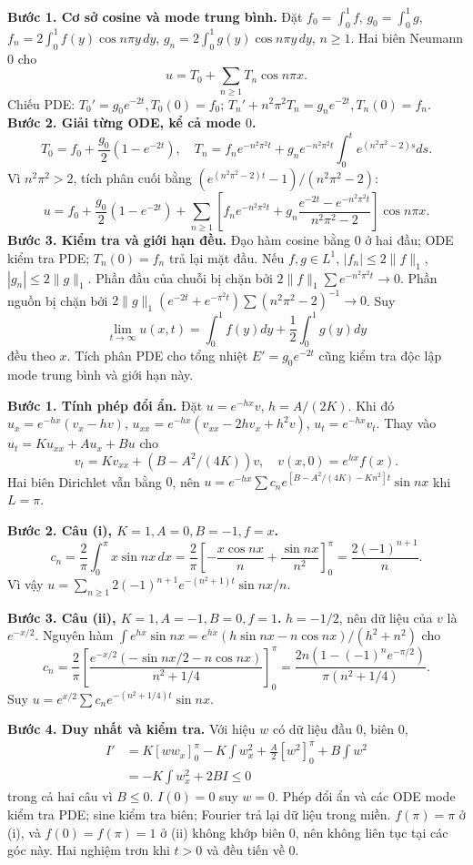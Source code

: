 \textbf{Bước 1. Cơ sở cosine và mode trung bình.}
Đặt $f_0=\int_0^1f$, $g_0=\int_0^1g$, $f_n=2\int_0^1f(y)\cos n\pi y\,dy$, $g_n=2\int_0^1g(y)\cos n\pi y\,dy$, $n\ge1$. Hai biên Neumann $0$ cho
\[u=T_0+\sum_{n\ge1}T_n\cos n\pi x.\]
Chiếu PDE: $T_0'=g_0e^{-2t},T_0(0)=f_0$; $T_n'+n^2\pi^2T_n=g_ne^{-2t},T_n(0)=f_n$.
\textbf{Bước 2. Giải từng ODE, kể cả mode $0$.}
\[T_0=f_0+\frac{g_0}2(1-e^{-2t}),\quad
T_n=f_ne^{-n^2\pi^2t}+g_ne^{-n^2\pi^2t}
\int_0^te^{(n^2\pi^2-2)s}ds.\]
Vì $n^2\pi^2>2$, tích phân cuối bằng $(e^{(n^2\pi^2-2)t}-1)/(n^2\pi^2-2)$:
\[u=f_0+\frac{g_0}2(1-e^{-2t})+
\sum_{n\ge1}\left[f_ne^{-n^2\pi^2t}
+g_n\frac{e^{-2t}-e^{-n^2\pi^2t}}{n^2\pi^2-2}\right]\cos n\pi x.\]
\textbf{Bước 3. Kiểm tra và giới hạn đều.}
Đạo hàm cosine bằng $0$ ở hai đầu; ODE kiểm tra PDE; $T_n(0)=f_n$ trả lại mặt đầu. Nếu $f,g\in L^1$, $|f_n|\le2\|f\|_1$, $|g_n|\le2\|g\|_1$. Phần đầu của chuỗi bị chặn bởi $2\|f\|_1\sum e^{-n^2\pi^2t}\to0$. Phần nguồn bị chặn bởi $2\|g\|_1(e^{-2t}+e^{-\pi^2t})\sum(n^2\pi^2-2)^{-1}\to0$. Suy
\[\lim_{t\to\infty}u(x,t)=\int_0^1f(y)dy+\frac12\int_0^1g(y)dy\]
đều theo $x$. Tích phân PDE cho tổng nhiệt $E'=g_0e^{-2t}$ cũng kiểm tra độc lập mode trung bình và giới hạn này.

\textbf{Bước 1. Tính phép đổi ẩn.}
Đặt $u=e^{-hx}v$, $h=A/(2K)$. Khi đó $u_x=e^{-hx}(v_x-hv)$, $u_{xx}=e^{-hx}(v_{xx}-2hv_x+h^2v)$, $u_t=e^{-hx}v_t$. Thay vào $u_t=Ku_{xx}+Au_x+Bu$ cho
\[v_t=Kv_{xx}+(B-A^2/(4K))v,\quad v(x,0)=e^{hx}f(x).\]
Hai biên Dirichlet vẫn bằng $0$, nên $u=e^{-hx}\sum c_ne^{[B-A^2/(4K)-Kn^2]t}\sin nx$ khi $L=\pi$.

\textbf{Bước 2. Câu (i), $K=1,A=0,B=-1,f=x$.}
\[c_n=\frac2\pi\int_0^\pi x\sin nx\,dx
=\frac2\pi\left[-\frac{x\cos nx}n+\frac{\sin nx}{n^2}\right]_0^\pi
=\frac{2(-1)^{n+1}}n.\]
Vì vậy $u=\sum_{n\ge1}2(-1)^{n+1}e^{-(n^2+1)t}\sin nx/n$.

\textbf{Bước 3. Câu (ii), $K=1,A=-1,B=0,f=1$.}
$h=-1/2$, nên dữ liệu của $v$ là $e^{-x/2}$. Nguyên hàm $\int e^{hx}\sin nx=e^{hx}(h\sin nx-n\cos nx)/(h^2+n^2)$ cho
\[c_n=\frac2\pi\left[\frac{e^{-x/2}(-\sin nx/2-n\cos nx)}{n^2+1/4}\right]_0^\pi
=\frac{2n(1-(-1)^ne^{-\pi/2})}{\pi(n^2+1/4)}.\]
Suy $u=e^{x/2}\sum c_ne^{-(n^2+1/4)t}\sin nx$.

\textbf{Bước 4. Duy nhất và kiểm tra.}
Với hiệu $w$ có dữ liệu đầu $0$, biên $0$,
\begin{align*}
I'&=K[ww_x]_0^\pi-K\int w_x^2+\frac A2[w^2]_0^\pi+B\int w^2\\
&=-K\int w_x^2+2BI\le0
\end{align*}
trong cả hai câu vì $B\le0$. $I(0)=0$ suy $w=0$. Phép đổi ẩn và các ODE mode kiểm tra PDE; sine kiểm tra biên; Fourier trả lại dữ liệu trong miền. $f(\pi)=\pi$ ở (i), và $f(0)=f(\pi)=1$ ở (ii) không khớp biên $0$, nên không liên tục tại các góc này. Hai nghiệm trơn khi $t>0$ và đều tiến về $0$.

